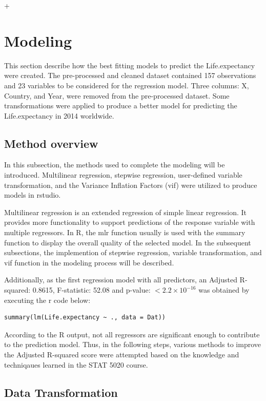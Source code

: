 +\section{Modeling}
\label{sec:modeling}

This section describe how the best fitting models to predict the Life.expectancy were created. The pre-processed and cleaned dataset contained 157 observations and 23 variables to be considered for the regression model. Three columns: X, Country, and Year, were removed from the pre-processed dataset. Some transformations were applied to produce a better model for predicting the Life.expectancy in 2014 worldwide.

\subsection{Method overview}

In this subsection, the methods used to complete the modeling will be introduced. Multilinear regression, stepwise regression, user-defined variable transformation, and the Variance Inflation Factors (vif) were utilized to produce models in rstudio.

Multilinear regression is an extended regression of simple linear regression. It provides more functionality to support predictions of the response variable with multiple regressors. In R, the mlr function usually is used with the summary function to display the overall quality of the selected model. In the subsequent subsections, the implemention of stepwise regression, variable transformation, and vif function in the modeling process will be described.

Additionally, as the first regression model with all predictors, an Adjusted R-squared: 0.8615, F-statistic: 52.08 and p-value: $< 2.2\times 10^{-16}$ was obtained by executing the r code below:

\begin{verbatim}
summary(lm(Life.expectancy ~ ., data = Dat))
\end{verbatim}

According to the R output, not all regressors are significant enough to contribute to the prediction model. Thus, in the following steps, various methods to improve the Adjusted R-squared score were attempted based on the knowledge and techniqaues learned in the STAT 5020 course.

\subsection{Data Transformation}

